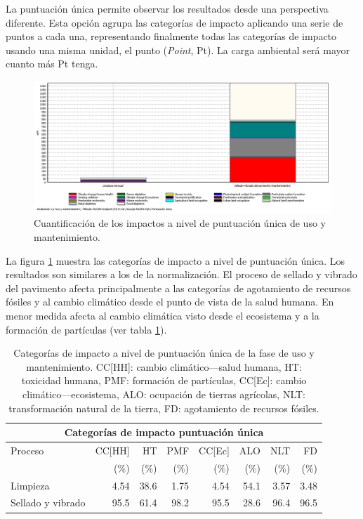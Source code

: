La puntuación única permite observar los resultados desde una perspectiva diferente. Esta opción agrupa las categorías de impacto aplicando una serie de puntos a cada una, representando finalmente todas las categorías de impacto usando una misma unidad, el punto (\textit{Point}, Pt). La carga ambiental será mayor cuanto más Pt tenga.

\begin{figure}[!htb]
\centering
\includegraphics[width=15cm]{img/uso_puntuacionunica.png}
\caption{Cuantificación de los impactos a nivel de puntuación única de uso y mantenimiento.}
\label{fig:uso_puntuacionunica}
\end{figure}

La figura \ref{fig:uso_puntuacionunica} muestra las categorías de impacto a nivel de puntuación única. Los resultados son similares a los de la normalización. El proceso de sellado y vibrado del pavimento afecta principalmente a las categorías de agotamiento de recursos fósiles y al cambio climático desde el punto de vista de la salud humana. En menor medida afecta al cambio climática visto desde el ecosistema y a la formación de partículas (ver tabla \ref{categoriasimpactousopuntunica}).

\begin{table}[!htb]
\centering
\begin{tabular}{p{4cm}rrrrrrr}
\toprule
\multicolumn{8}{c}{Categorías de impacto puntuación única}\\
\midrule
Proceso & CC[HH] & HT & PMF & CC[Ec] & ALO & NLT & FD\\
 &  (\%) & (\%) & (\%) & (\%) & (\%) & (\%) & (\%)\\
\midrule
Limpieza & 4.54 & 38.6 & 1.75 & 4.54 & 54.1 & 3.57 & 3.48\\
Sellado y vibrado & 95.5 & 61.4 & 98.2 & 95.5 & 28.6 & 96.4 & 96.5\\
\bottomrule
\end{tabular}
\caption[Categorías de impacto a nivel de puntuación única de la fase de uso y mantenimiento.]{Categorías de impacto a nivel de puntuación única de la fase de uso y mantenimiento. CC[HH]: cambio climático—salud humana, HT: toxicidad humana, PMF: formación de partículas, CC[Ec]: cambio climático—ecosistema, ALO: ocupación de tierras agrícolas, NLT: transformación natural de la tierra, FD: agotamiento de recursos fósiles.}
\label{categoriasimpactousopuntunica}
\end{table}

